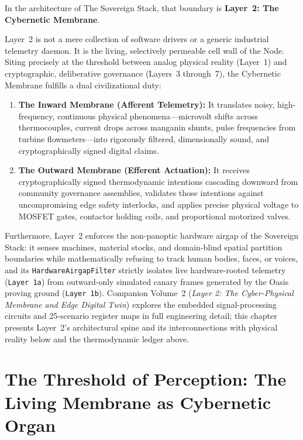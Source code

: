 In the architecture of The Sovereign Stack, that boundary is \textbf{Layer~2: The Cybernetic Membrane}.

Layer~2 is not a mere collection of software drivers or a generic industrial telemetry daemon. It is the living, selectively permeable cell wall of the Node. Siting precisely at the threshold between analog physical reality (Layer~1) and cryptographic, deliberative governance (Layers~3 through~7), the Cybernetic Membrane fulfills a dual civilizational duty:
\begin{enumerate}
    \item \textbf{The Inward Membrane (Afferent Telemetry):} It translates noisy, high-frequency, continuous physical phenomena---microvolt shifts across thermocouples, current drops across manganin shunts, pulse frequencies from turbine flowmeters---into rigorously filtered, dimensionally sound, and cryptographically signed digital claims.
    \item \textbf{The Outward Membrane (Efferent Actuation):} It receives cryptographically signed thermodynamic intentions cascading downward from community governance assemblies, validates those intentions against uncompromising edge safety interlocks, and applies precise physical voltage to MOSFET gates, contactor holding coils, and proportional motorized valves.
\end{enumerate}

Furthermore, Layer~2 enforces the non-panoptic hardware airgap of the Sovereign Stack: it senses machines, material stocks, and domain-blind spatial partition boundaries while mathematically refusing to track human bodies, faces, or voices, and its \texttt{HardwareAirgapFilter} strictly isolates live hardware-rooted telemetry (\texttt{Layer 1a}) from outward-only simulated canary frames generated by the Oasis proving ground (\texttt{Layer 1b}). Companion Volume~2 (\textit{Layer 2: The Cyber-Physical Membrane and Edge Digital Twin}) explores the embedded signal-processing circuits and 25-scenario register maps in full engineering detail; this chapter presents Layer~2's architectural spine and its interconnections with physical reality below and the thermodynamic ledger above.

\section{The Threshold of Perception: The Living Membrane as Cybernetic Organ}
\label{sec:l2_threshold}

